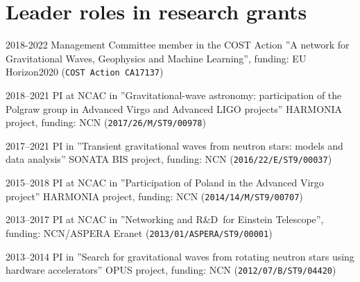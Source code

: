 \documentclass[]{friggeri-cv} %
\begin{document}
% 
\vskip 0.5cm 
\section{Leader roles in research grants} 
\begin{entrylistoc}

\entrys 
{2018-2022} 
{Management Committee member in the COST Action ''A network for Gravitational Waves, Geophysics and Machine Learning'', funding: EU Horizon2020 ({\tt COST Action CA17137}) } 
   
\entrys
{2018--2021}
{PI at NCAC in ''Gravitational-wave astronomy: participation of the Polgraw group in Advanced Virgo and Advanced LIGO projects'' HARMONIA project, funding: NCN ({\tt 2017/26/M/ST9/00978})}

\entrys
{2017--2021} 
{PI in ''Transient gravitational waves from neutron stars: models and data analysis'' SONATA BIS project, funding: NCN ({\tt 2016/22/E/ST9/00037})} 

\entrys
{2015--2018} 
{PI at NCAC in ''Participation of Poland in the Advanced Virgo project'' HARMONIA project, funding: NCN ({\tt 2014/14/M/ST9/00707})} 

\entrys
{2013--2017}
{PI at NCAC in ''Networking and R\&D for Einstein Telescope'', funding: NCN/ASPERA Eranet ({\tt 2013/01/ASPERA/ST9/00001})}

\entrys
{2013--2014}
{PI in ''Search for gravitational waves from rotating neutron stars using hardware accelerators'' OPUS project, funding: NCN ({\tt 2012/07/B/ST9/04420})} 

\end{entrylistoc}


\end{document}
